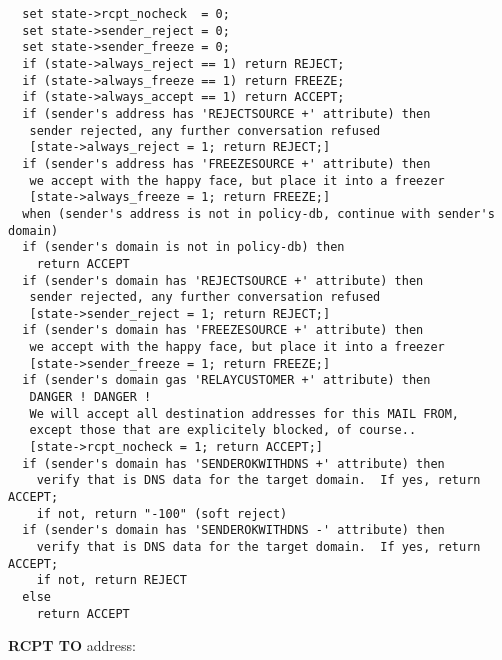 \begin{tscreen}
\begin{verbatim}
  set state->rcpt_nocheck  = 0;
  set state->sender_reject = 0;
  set state->sender_freeze = 0;
  if (state->always_reject == 1) return REJECT;
  if (state->always_freeze == 1) return FREEZE;
  if (state->always_accept == 1) return ACCEPT;
  if (sender's address has 'REJECTSOURCE +' attribute) then
   sender rejected, any further conversation refused
   [state->always_reject = 1; return REJECT;]
  if (sender's address has 'FREEZESOURCE +' attribute) then
   we accept with the happy face, but place it into a freezer
   [state->always_freeze = 1; return FREEZE;]
  when (sender's address is not in policy-db, continue with sender's domain)
  if (sender's domain is not in policy-db) then
    return ACCEPT
  if (sender's domain has 'REJECTSOURCE +' attribute) then
   sender rejected, any further conversation refused
   [state->sender_reject = 1; return REJECT;]
  if (sender's domain has 'FREEZESOURCE +' attribute) then
   we accept with the happy face, but place it into a freezer
   [state->sender_freeze = 1; return FREEZE;]
  if (sender's domain gas 'RELAYCUSTOMER +' attribute) then
   DANGER ! DANGER !
   We will accept all destination addresses for this MAIL FROM,
   except those that are explicitely blocked, of course..
   [state->rcpt_nocheck = 1; return ACCEPT;]
  if (sender's domain has 'SENDEROKWITHDNS +' attribute) then
    verify that is DNS data for the target domain.  If yes, return ACCEPT;
    if not, return "-100" (soft reject)
  if (sender's domain has 'SENDEROKWITHDNS -' attribute) then
    verify that is DNS data for the target domain.  If yes, return ACCEPT;
    if not, return REJECT
  else
    return ACCEPT
\end{verbatim}
\end{tscreen}


{\bf RCPT TO} address:

